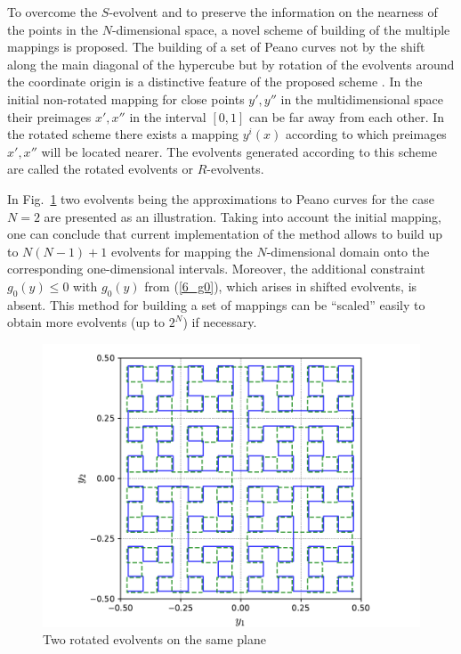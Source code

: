 \documentclass[runningheads]{llncs}
\begin{document}
To overcome the $S$-evolvent and to preserve the information on the nearness of the points in the $N$-dimensional space, a novel scheme of building of the multiple mappings is proposed. The building of a set of Peano curves not by the shift along the main diagonal of the hypercube but by rotation of the evolvents around the coordinate origin is a distinctive feature of the proposed scheme \cite{Gergel2009}. In the initial non-rotated mapping for close points $y', y''$ in the multidimensional space their preimages  $x', x''$ in the interval $[0,1]$ can be far away from each other. In the rotated scheme there exists a mapping $y^i(x)$ according to which preimages $x', x''$ will be located nearer. The evolvents generated according to this scheme are called the rotated evolvents or $R$-evolvents.

In Fig.~\ref{6_fig_9} two evolvents being the approximations to Peano curves for the case $N=2$ are presented as an illustration.
Taking into account the initial mapping, one can conclude that current implementation of the method allows to build up to $N(N-1)+1$ evolvents for mapping the $N$-dimensional domain onto the corresponding one-dimensional intervals. Moreover, the additional constraint  $g_0(y) \leq 0$ with $g_0(y)$ from (\ref{6_g0}), which arises in shifted evolvents, is absent. This method for building a set of mappings can be ``scaled'' easily to obtain more evolvents (up to $2^N$) if necessary.

\begin{figure}[t]
  \centering
  \includegraphics[width=0.6\linewidth]{pictures/rotated.pdf}
  \caption{Two rotated evolvents on the same plane}
  \label{6_fig_9}
\end{figure}

\end{document}
